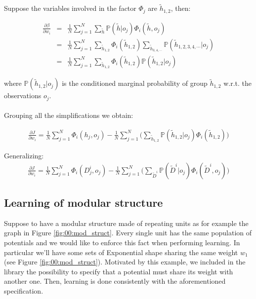 Suppose the variables involved in the factor $\Phi _j$ are $\tilde{h} _{1,2}$, then:

\begin{eqnarray}
\frac{\partial \beta}{\partial w_i} &=& \frac{1}{N} \sum_{j=1}^{N}  \sum_{\tilde{h}} \mathbb{P}(\tilde{h}| o_j) \Phi_i(\tilde{h}, o_j) \nonumber\\
&=& \frac{1}{N} \sum_{j=1}^{N}  \sum_{\tilde{h}_{1,2}} \Phi_i(\tilde{h}_{1,2}) \sum_{\tilde{h}_{3,4,\cdots}} \mathbb{P}(\tilde{h} _{1,2,3,4,\cdots}| o_j) \nonumber\\
&=& \frac{1}{N} \sum_{j=1}^{N}  \sum_{\tilde{h}_{1,2}} \Phi_i(\tilde{h}_{1,2}) \mathbb{P}(\tilde{h} _{1,2}| o_j)
\end{eqnarray}

where $\mathbb{P}(\tilde{h} _{1,2} | o_j)$ is the conditioned marginal probability of group $\tilde{h} _{1,2}$ w.r.t. the observations $o_j$.
\\
\\
Grouping all the simplifications we obtain:
 
\begin{eqnarray}
\frac{\partial J}{\partial w_i} = \frac{1}{N} \sum_{j=1}^N \Phi_i(h_j, o_j) - 
\frac{1}{N} \sum_{j=1}^N \bigg( \sum_{\tilde{h}_{1,2}} \mathbb{P}(\tilde{h}_{1,2}|o_j) \Phi_i(\tilde{h}_{1,2}) \bigg)
\end{eqnarray}

Generalizing:
\begin{eqnarray}
\frac{\partial J}{\partial w_i} = \frac{1}{N} \sum_{j=1}^N \Phi_i(D_j^i, o_j) - 
\frac{1}{N} \sum_{j=1}^N \bigg( \sum_{\tilde{D}^i} \mathbb{P}(\tilde{D}^i|o_j) \Phi_i(\tilde{D}^i, o_j) \bigg)
\label{eq:00:J_grad_con}
\end{eqnarray}

\subsection{Learning of modular structure}
\label{sec:00:MODULE_LEARN}

Suppose to have a modular structure made of repeating units as for example the graph in Figure \ref{fig:00:mod_struct}. Every single unit has the same population of potentials and we would like to enforce this fact when performing learning. In particular we'll have some sets of Exponential shape sharing the same weight $w_1$ (see Figure \ref{fig:00:mod_struct}). Motivated by this example, we included in the library the possibility to specify that a potential must share its weight with another one. Then, learning is done consistently with the aforementioned specification.

